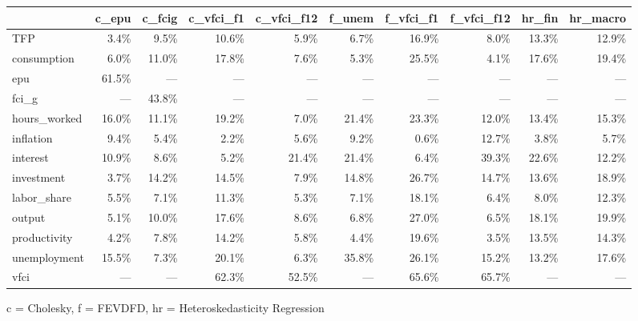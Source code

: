 
\fontsize{12.0pt}{14.4pt}\selectfont
\begin{tabular*}{\linewidth}{@{\extracolsep{\fill}}l|rrrrrrrrr}
\toprule
 & c\_epu & c\_fcig & c\_vfci\_f1 & c\_vfci\_f12 & f\_unem & f\_vfci\_f1 & f\_vfci\_f12 & hr\_fin & hr\_macro \\ 
\midrule\addlinespace[2.5pt]
TFP & 3.4\% & 9.5\% & 10.6\% & 5.9\% & 6.7\% & 16.9\% & 8.0\% & 13.3\% & 12.9\% \\ 
consumption & 6.0\% & 11.0\% & 17.8\% & 7.6\% & 5.3\% & 25.5\% & 4.1\% & 17.6\% & 19.4\% \\ 
epu & 61.5\% & — & — & — & — & — & — & — & — \\ 
fci\_g & — & 43.8\% & — & — & — & — & — & — & — \\ 
hours\_worked & 16.0\% & 11.1\% & 19.2\% & 7.0\% & 21.4\% & 23.3\% & 12.0\% & 13.4\% & 15.3\% \\ 
inflation & 9.4\% & 5.4\% & 2.2\% & 5.6\% & 9.2\% & 0.6\% & 12.7\% & 3.8\% & 5.7\% \\ 
interest & 10.9\% & 8.6\% & 5.2\% & 21.4\% & 21.4\% & 6.4\% & 39.3\% & 22.6\% & 12.2\% \\ 
investment & 3.7\% & 14.2\% & 14.5\% & 7.9\% & 14.8\% & 26.7\% & 14.7\% & 13.6\% & 18.9\% \\ 
labor\_share & 5.5\% & 7.1\% & 11.3\% & 5.3\% & 7.1\% & 18.1\% & 6.4\% & 8.0\% & 12.3\% \\ 
output & 5.1\% & 10.0\% & 17.6\% & 8.6\% & 6.8\% & 27.0\% & 6.5\% & 18.1\% & 19.9\% \\ 
productivity & 4.2\% & 7.8\% & 14.2\% & 5.8\% & 4.4\% & 19.6\% & 3.5\% & 13.5\% & 14.3\% \\ 
unemployment & 15.5\% & 7.3\% & 20.1\% & 6.3\% & 35.8\% & 26.1\% & 15.2\% & 13.2\% & 17.6\% \\ 
vfci & — & — & 62.3\% & 52.5\% & — & 65.6\% & 65.7\% & — & — \\ 
\bottomrule
\end{tabular*}
\begin{minipage}{\linewidth}
c = Cholesky, f = FEVDFD, hr = Heteroskedasticity Regression\\
\end{minipage}



